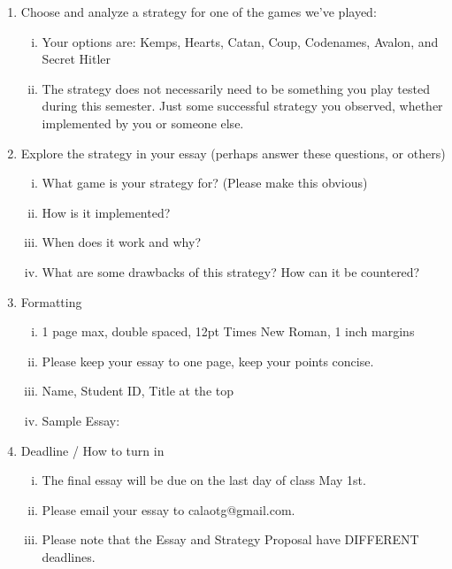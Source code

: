 \documentclass[11.5pt]{article}
\begin{document}
\begin{enumerate}
\setlength{\itemsep}{3pt}
\item Choose and analyze a strategy for one of the games we've played:
	\begin{enumerate}[(i)]
	\item Your options are: Kemps, Hearts, Catan, Coup, Codenames, Avalon, and Secret Hitler
	\item The strategy does not necessarily need to be something you play tested during this semester. Just some successful strategy you observed, whether implemented by you or someone else.
	\end{enumerate}
\item Explore the strategy in your essay (perhaps answer these questions, or others)
	\begin{enumerate}[(i)]
	\item What game is your strategy for? (Please make this obvious)
	\item How is it implemented?
	\item When does it work and why?
	\item What are some drawbacks of this strategy? How can it be countered?
	\end{enumerate}
\item Formatting
	\begin{enumerate}[(i)]
	\item 1 page max, double spaced, 12pt Times New Roman, 1 inch margins
	\item Please keep your essay to one page, keep your points concise.
	\item Name, Student ID, Title at the top
	\item Sample Essay: 
	\end{enumerate}
\item Deadline / How to turn in
	\begin{enumerate}[(i)]
	\item The final essay will be due on the last day of class May 1st.
	\item Please email your essay to calaotg@gmail.com.
	\item Please note that the Essay and Strategy Proposal have DIFFERENT deadlines.
	\end{enumerate}
\end{enumerate}
\end{document}
